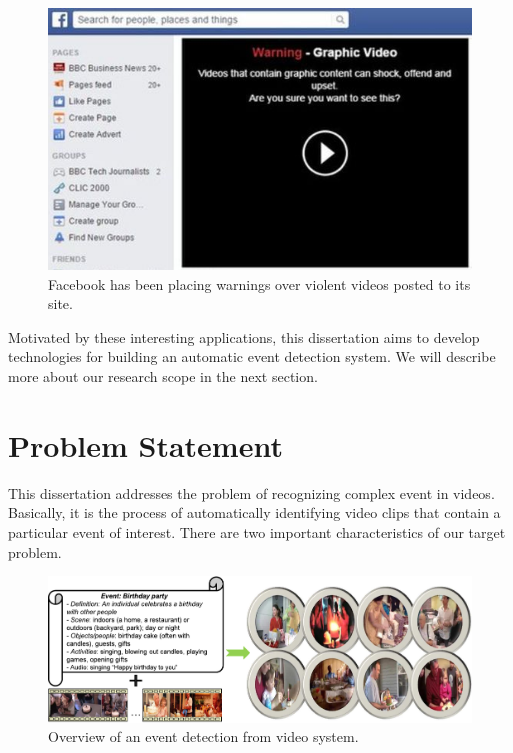 \begin{itemize}
	\begin{figure}
		\centering
		\includegraphics[width=1\textwidth]{facebook.png}
		\caption{Facebook has been placing warnings over violent videos posted to its site.}
		\label{c1_facebook}
	\end{figure}
	
\end{itemize}

Motivated by these interesting applications, this dissertation aims to develop technologies for building an automatic event detection system. We will describe more about our research scope in the next section.

\section{Problem Statement}
\label{c1_problemdefinition}
This dissertation addresses the problem of recognizing complex event in videos. Basically, it is the process of automatically identifying video clips that contain a particular event of interest. There are two important characteristics of our target problem. 

\begin{figure}
	\centering
	\includegraphics[width=1\textwidth]{eventdetection.pdf}
	\caption{Overview of an event detection from video system.}
	\label{c1_eventdetection}
\end{figure}

